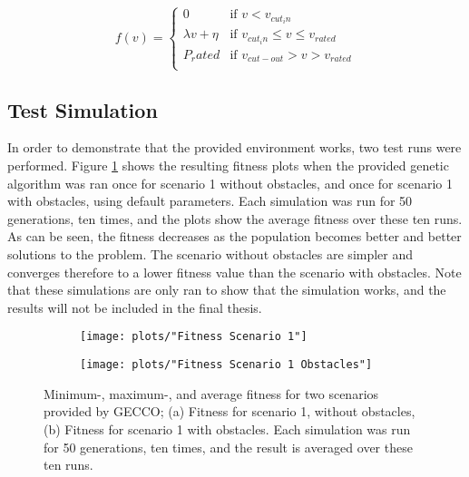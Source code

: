 \begin{equation}
 f(v) = 
  \begin{cases} 
   0                                  & \text{if }     v < v_{cut_in} \\
   \lambda v + \eta           & \text{if }     v_{cut_in} \leq v \leq v_{rated} \\
   P_rated                        & \text{if }     v_{cut-out} > v > v_{rated} \\
  \end{cases}
  \label{equation:Power Curv (API)}
\end{equation}


\subsection{Test Simulation}
In order to demonstrate that the provided environment works, two test runs were performed. Figure \ref{Test Plots} shows the resulting fitness plots when the provided genetic algorithm was ran once for scenario 1 without obstacles, and once for scenario 1 with obstacles, using default parameters. Each simulation was run for 50 generations, ten times, and the plots show the average fitness over these ten runs. As can be seen, the fitness decreases as the population becomes better and better solutions to the problem. The scenario without obstacles are simpler and converges therefore to a lower fitness value than the scenario with obstacles. Note that these simulations are only ran to show that the simulation works, and the results will not be included in the final thesis. 


\begin{figure}[h!]
    \centering
    \begin{subfigure}[b]{0.45\textwidth}
        \texttt{[image: plots/"Fitness Scenario 1"]}
        \caption{}
    \end{subfigure}
    \begin{subfigure}[b]{0.45\textwidth}
        \texttt{[image: plots/"Fitness Scenario 1 Obstacles"]}
        \caption{}
    \end{subfigure}
    \caption{Minimum-, maximum-, and average fitness for two scenarios provided by GECCO; (a) Fitness for scenario 1, without obstacles, (b) Fitness for scenario 1 with obstacles. Each simulation was run for 50 generations, ten times, and the result is averaged over these ten runs.}
    \label{Test Plots}
\end{figure}


